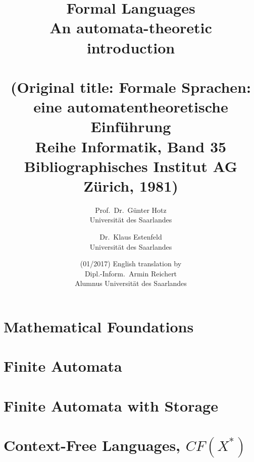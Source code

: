 \documentclass[a4paper]{amsbook}
\title{
Formal Languages\\An automata-theoretic introduction\\
\ \\
(Original title: Formale Sprachen: eine automatentheoretische Einführung\\
Reihe Informatik, Band 35\\
Bibliographisches Institut AG Zürich, 1981)
}
\author{
Prof.\ Dr.\ Günter Hotz\\Universität des Saarlandes 
\and Dr.\ Klaus Estenfeld\\Universität des Saarlandes
\and (01/2017) English translation by\\Dipl.-Inform.\ Armin Reichert\\Alumnus
Universität des Saarlandes}
\begin{document}
\maketitle

\tableofcontents

\chapter{Mathematical Foundations}






\chapter{Finite Automata}








\chapter{Finite Automata with Storage}





\chapter{Context-Free Languages, $CF(X^*)$}




\nocite{*}

\end{document}
